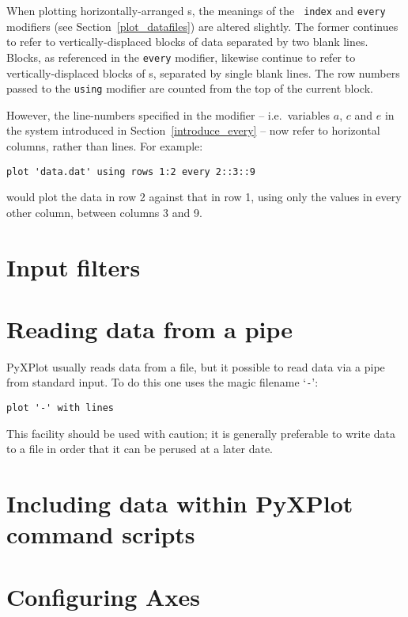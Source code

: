 When plotting horizontally-arranged \datafile s, the meanings of the {\tt
index} and {\tt every} modifiers (see Section~\ref{plot_datafiles}) are altered
slightly. The former continues to refer to vertically-displaced blocks of data
separated by two blank lines.  Blocks, as referenced in the {\tt every}
modifier, likewise continue to refer to vertically-displaced blocks of
\datapoint s, separated by single blank lines. The row numbers passed to the
{\tt using} modifier are counted from the top of the current block.

However, the line-numbers specified in the  modifier -- i.e.\
variables $a$, $c$ and $e$ in the system introduced in
Section~\ref{introduce_every} -- now refer to horizontal columns, rather than
lines. For example:

\begin{verbatim}
plot 'data.dat' using rows 1:2 every 2::3::9
\end{verbatim}

\noindent would plot the data in row 2 against that in row 1, using only the
values in every other column, between columns 3 and 9.

\section{Input filters}

\section{Reading data from a pipe}

PyXPlot usually reads data from a file, but it possible to read data via a pipe
from standard input.  To do this one uses the magic filename `{\tt -}':

\begin{verbatim}
plot '-' with lines
\end{verbatim}

This facility should be used with caution; it is generally preferable to write
data to a file in order that it can be perused at a later date.

\section{Including data within PyXPlot command scripts}

\section{Configuring Axes}
\label{axis_extensions}\label{ranges_multiaxes}\label{multiple_axes}

